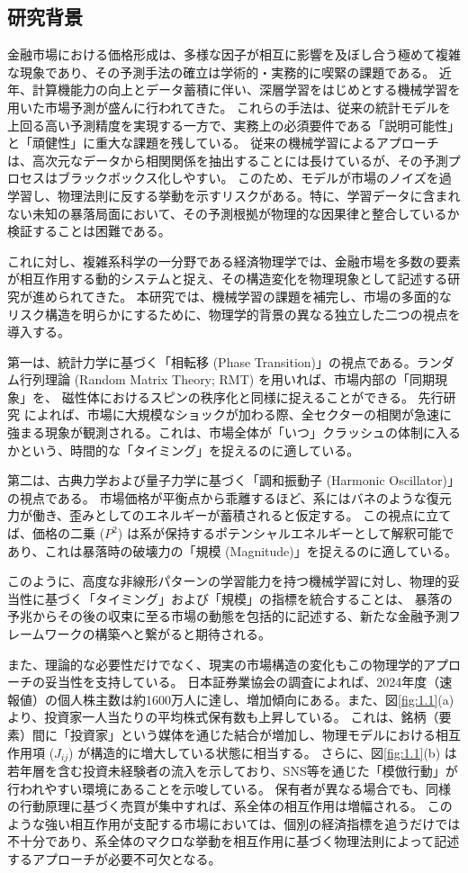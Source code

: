 \documentclass[11pt,a4paper,oneside]{ltjsarticle}
\begin{document}
\subsection{研究背景}
金融市場における価格形成は、多様な因子が相互に影響を及ぼし合う極めて複雑な現象であり、その予測手法の確立は学術的・実務的に喫緊の課題である。
近年、計算機能力の向上とデータ蓄積に伴い、深層学習をはじめとする機械学習を用いた市場予測が盛んに行われてきた。
これらの手法は、従来の統計モデルを上回る高い予測精度を実現する一方で、実務上の必須要件である「説明可能性」と「頑健性」に重大な課題を残している。
従来の機械学習によるアプローチは、高次元なデータから相関関係を抽出することには長けているが、その予測プロセスはブラックボックス化しやすい。
このため、モデルが市場のノイズを過学習し、物理法則に反する挙動を示すリスクがある。特に、学習データに含まれない未知の暴落局面において、その予測根拠が物理的な因果律と整合しているか検証することは困難である。

これに対し、複雑系科学の一分野である経済物理学では、金融市場を多数の要素が相互作用する動的システムと捉え、その構造変化を物理現象として記述する研究が進められてきた。
本研究では、機械学習の課題を補完し、市場の多面的なリスク構造を明らかにするために、物理学的背景の異なる独立した二つの視点を導入する。

第一は、統計力学に基づく「相転移 (Phase Transition)」の視点である。ランダム行列理論 (Random Matrix Theory; RMT) を用いれば、市場内部の「同期現象」を、
磁性体におけるスピンの秩序化と同様に捉えることができる。
先行研究 \cite{cite:1} によれば、市場に大規模なショックが加わる際、全セクターの相関が急速に強まる現象が観測される。これは、市場全体が「いつ」クラッシュの体制に入るかという、時間的な「タイミング」を捉えるのに適している。

第二は、古典力学および量子力学に基づく「調和振動子 (Harmonic Oscillator)」の視点である。
市場価格が平衡点から乖離するほど、系にはバネのような復元力が働き、歪みとしてのエネルギーが蓄積されると仮定する。
この視点に立てば、価格の二乗 ($P^2$) は系が保持するポテンシャルエネルギーとして解釈可能であり、これは暴落時の破壊力の「規模 (Magnitude)」を捉えるのに適している。

このように、高度な非線形パターンの学習能力を持つ機械学習に対し、物理的妥当性に基づく「タイミング」および「規模」の指標を統合することは、
暴落の予兆からその後の収束に至る市場の動態を包括的に記述する、新たな金融予測フレームワークの構築へと繋がると期待される。

また、理論的な必要性だけでなく、現実の市場構造の変化もこの物理学的アプローチの妥当性を支持している。
日本証券業協会\cite{cite:2}の調査によれば、2024年度（速報値）の個人株主数は約1600万人に達し、増加傾向にある。また、図\ref{fig:1.1}(a) より、投資家一人当たりの平均株式保有数も上昇している。
これは、銘柄（要素）間に「投資家」という媒体を通じた結合が増加し、物理モデルにおける相互作用項 ($J_{ij}$) が構造的に増大している状態に相当する。
さらに、図\ref{fig:1.1}(b) は若年層を含む投資未経験者の流入を示しており、SNS等を通じた「模倣行動」が行われやすい環境にあることを示唆している。
保有者が異なる場合でも、同様の行動原理に基づく売買が集中すれば、系全体の相互作用は増幅される。
このような強い相互作用が支配する市場においては、個別の経済指標を追うだけでは不十分であり、系全体のマクロな挙動を相互作用に基づく物理法則によって記述するアプローチが必要不可欠となる。
\end{document}
